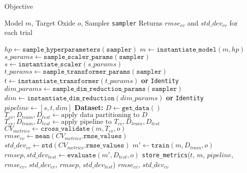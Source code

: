 \begin{algorithm}
\caption{Objective}
\label{alg:combined_objective}
\begin{algorithmic}[1]
\Require Model $m$, Target Oxide $o$, Sampler \texttt{sampler} \label{step:combined_objective_params}
\Ensure Returns $rmse_{cv}$ and $std\_dev_{cv}$ for each trial

\State $hp \gets \texttt{sample\_hyperparameters}(\texttt{sampler})$ \label{step:sample_hyperparameters}
\State $m \gets \texttt{instantiate\_model}(m, hp)$ \label{step:instantiate_model}
\Statex
\State $s\_params \gets \texttt{sample\_scaler\_params}(\texttt{sampler})$ \label{step:sample_scaler_params}
\State $s \gets \texttt{instantiate\_scaler}(s\_params)$ \label{step:instantiate_scaler}
\State $t\_params \gets \texttt{sample\_transformer\_params}(\texttt{sampler})$ \label{step:sample_transformer_params}
\State $t \gets \texttt{instantiate\_transformer}(t\_params)$ \label{step:instantiate_transformer}
\Statex \hspace{3em} \textbf{or} \texttt{Identity}
\State $dim\_params \gets \texttt{sample\_dim\_reduction\_params}(\texttt{sampler})$ \label{step:sample_dim_reduction_params}
\State $dim \gets \texttt{instantiate\_dim\_reduction}(dim\_params)$ \label{step:instantiate_dim_reduction}
\Statex \hspace{3em} \textbf{or} \texttt{Identity}
\Statex     
\State $pipeline \gets [s, t, dim]$ \label{step:construct_pipeline}
\Statex
\State \textbf{Dataset: }$D \gets \texttt{get\_data}()$ \label{step:get_data} 
\State $T_{cv}, D_{train}, D_{test} \gets \text{apply data partitioning to } D$ \label{step:data_partitioning}
\Statex
\State $T_{cv}, D_{train}, D_{test} \gets \text{apply pipeline to } T_{cv}, D_{train}, D_{test}$ \label{step:apply_pipeline}
\Statex
\State $CV_{metrics} \gets \texttt{cross\_validate}(m, T_{cv}, o)$ \label{step:cross_validate}
\State $rmse_{cv} \gets \texttt{mean}(CV_{metrics}.\texttt{rmse\_values})$ \label{step:mean_rmse_cv}
\State $std\_dev_{cv} \gets \texttt{std}(CV_{metrics}.\texttt{rmse\_values})$ \label{step:std_dev_cv}
\Statex
\State $m' \gets \texttt{train}(m, D_{train}, o)$ \label{step:train_model}
\State $rmsep, std\_dev_{test} \gets \texttt{evaluate}(m', D_{test}, o)$ \label{step:evaluate_model}
\Statex
\State \texttt{store\_metrics}($t$, $m$, $pipeline$, $rmse_{cv}$, 
\Statex \hspace{8em} $std\_dev_{cv}$, $rmsep$, $std\_dev_{test}$) \label{step:store_metrics}
\Statex
\State \Return $rmse_{cv}$, $std\_dev_{cv}$ \label{step:return_metrics}
\end{algorithmic}
\end{algorithm}
